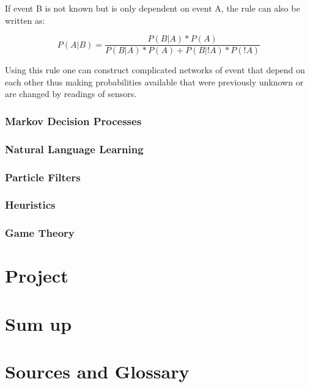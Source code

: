 If event B is not known but is only dependent on event A, the rule can also be written as:

\[P(A|B)=\frac{P(B|A) * P(A)}{P(B|A)*P(A)+P(B|!A)*P(!A)}\]

Using this rule one can construct complicated networks of event that depend on each other thus making probabilities available that were previously unknown or are changed by readings of sensors.

\subsection{Markov Decision Processes}



\subsection{Natural Language Learning}
\subsection{Particle Filters}
\subsection{Heuristics}
\subsection{Game Theory}

\chapter{Project}



\chapter{Sum up}


\chapter{Sources and Glossary}

